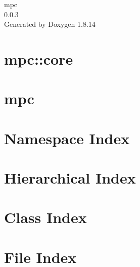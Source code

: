 \documentclass[twoside]{book}
\newcommand{\+}{\discretionary{\mbox{\scriptsize$\hookleftarrow$}}{}{}}
\newcommand{\clearemptydoublepage}{%
  \newpage{\pagestyle{empty}\cleardoublepage}%
}
\begin{document}
\hypersetup{pageanchor=false,
             bookmarksnumbered=true,
             pdfencoding=unicode
            }
\begin{titlepage}
\vspace*{7cm}
\begin{center}%
{\Large mpc \\[1ex]\large 0.\+0.\+3 }\\
\vspace*{1cm}
{\large Generated by Doxygen 1.8.14}\\
\end{center}
\end{titlepage}
\clearemptydoublepage
{}
\tableofcontents
\clearemptydoublepage
{}
\hypersetup{pageanchor=true}

\chapter{mpc\+:\+:core}
\label{md___users_atorlucci__documents_github_threecubed_repos_mpc_src_mpc_core__r_e_a_d_m_e}

\chapter{mpc}
\label{md___users_atorlucci__documents_github_threecubed_repos_mpc_src_mpc__r_e_a_d_m_e}

\chapter{Namespace Index}

\chapter{Hierarchical Index}

\chapter{Class Index}

\chapter{File Index}

\end{document}
